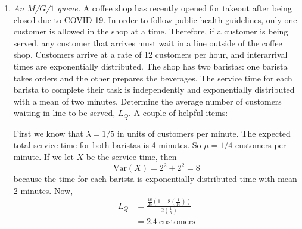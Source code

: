 \begin{enumerate}
\item \emph{An $M$/$G$/$1$ queue.}  A coffee shop has recently opened for takeout after being closed due to COVID-19. In order to follow public health guidelines, only one customer is allowed in the shop at a time. Therefore, if a customer is being served, any customer that arrives must wait in a line outside of the coffee shop. Customers arrive at a rate of 12 customers per hour, and interarrival times are exponentially distributed. The shop has two baristas: one barista takes orders and the other prepares the beverages. The service time for each barista to complete their task is independently and exponentially distributed with a mean of two minutes. Determine the average number of customers waiting in line to be served,
$L_Q$. A couple of helpful items: 

\begin{solution}
	\bs First we know that $\lambda = 1/5$ in units of customers per
	minute. The expected total service time for both baristas is 4 minutes. So $\mu = 1/4$ customers per minute. If we let $X$ be the
	service time, then
	\[ \text{Var}(X) = 2^2 + 2^2 = 8\] because the time for each barista is exponentially distributed time with mean 2 minutes.
	Now,
	\begin{align*}
		L_Q &= \frac{\frac{16}{25}\left(1 + 8\left(\frac{1}{16}\right)\right)}{2\left(\frac{1}{5}\right)} \\
		&= 2.4 ~\text{customers}
	\end{align*}
\end{solution}



\end{enumerate}
